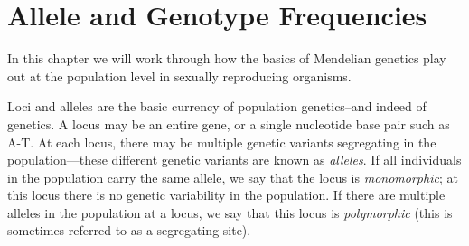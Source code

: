 


\chapter{Allele and Genotype Frequencies}
 In this chapter we will
work through how the basics of Mendelian genetics play out at the population
level in sexually reproducing organisms.

	Loci and alleles are the basic currency of population genetics--and indeed of
genetics.  A locus
may be an entire gene, or a single nucleotide base pair such as A-T. At each
locus, there may be multiple genetic variants segregating in the
population---these different genetic variants are known as \emph{alleles}. If
all individuals in the population carry the same allele, we say that the locus
is \emph{monomorphic}; at this locus there is no genetic variability in the
population. If there are multiple alleles in the population at a locus, we say
that this locus is \emph{polymorphic} (this is sometimes referred to
as a segregating site).

